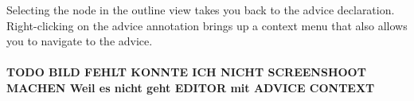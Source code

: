 Selecting the  node in the outline view takes you back to the advice declaration. Right-clicking on the advice annotation brings up a context menu that also allows you to navigate to the advice.\\\\
\textbf{TODO BILD FEHLT KONNTE ICH NICHT SCREENSHOOT MACHEN  Weil es nicht geht EDITOR mit ADVICE CONTEXT}

